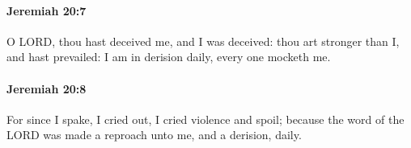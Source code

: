		\paragraph{Jeremiah 20:7} %
			\label{JEREMIAH-20-7}

			O LORD, thou hast deceived me, and I was deceived: thou art stronger than I, and hast prevailed: I am in derision daily, every one mocketh me.


		\paragraph{Jeremiah 20:8} %
			\label{JEREMIAH-20-8}

			For since I spake, I cried out, I cried violence and spoil; because the word of the LORD was made a reproach unto me, and a derision, daily.


